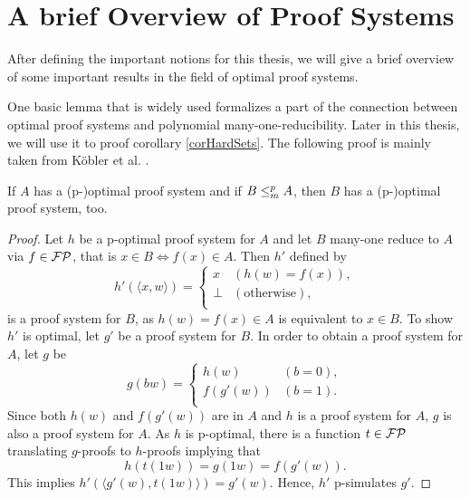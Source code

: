 \chapter{A brief Overview of Proof Systems} \label{chpOverview}
  After defining the important notions for this thesis, we will give a brief overview of some important results in the field of optimal proof systems.

  One basic lemma that is widely used formalizes a part of the connection between optimal proof systems and polynomial many-one-reducibility. Later in this thesis, we will use it to proof corollary \ref{corHardSets}. The following proof is mainly taken from Köbler et al. \cite{KMT03}.

  \begin{lemma} \label{lemManyOneProofSystem}
    If \(A\) has a (p-)optimal proof system and if \(B \leq_{m}^{p} A\), then \(B\) has a (p-)optimal proof system, too.
  \end{lemma}

  \begin{proof}
    Let \(h\) be a p-optimal proof system for \(A\) and let \(B\) many-one reduce to \(A\) via \(f \in \mathcal{FP}\), that is \(x \in B \Leftrightarrow f(x) \in A\). Then \(h'\) defined by
      \[
        h'(\langle x, w \rangle) =
        \begin{cases}
          x & (h(w) = f(x)), \\
          \perp & (\text{otherwise}), \\
        \end{cases}
      \]
    is a proof system for \(B\), as \(h(w) = f(x) \in A\) is equivalent to \(x \in B\). To show \(h'\) is optimal, let \(g'\) be a proof system for \(B\). In order to obtain a proof system for \(A\), let \(g\) be
      \[
        g(bw) =
        \begin{cases}
          h(w) & (b = 0), \\
          f(g'(w)) & (b = 1). \\
        \end{cases}
      \]
    Since both \(h(w)\) and \(f(g'(w))\) are in \(A\) and \(h\) is a proof system for \(A\), \(g\) is also a proof system for \(A\). As \(h\) is p-optimal, there is a function \(t \in \mathcal{FP}\) translating \(g\)-proofs to \(h\)-proofs implying that
    \[
      h(t(1w)) = g(1w) = f(g'(w)).
    \]
    This implies \(h'(\langle g'(w), t(1w) \rangle ) = g'(w)\). Hence, \(h'\) p-simulates \(g'\).
  \end{proof}

